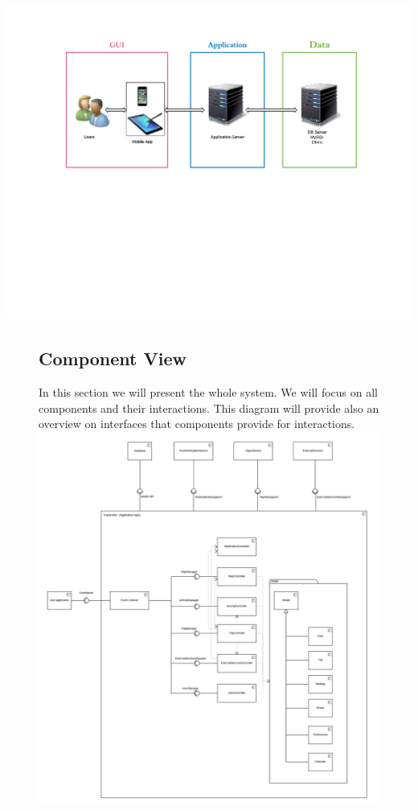 \documentclass[12pt,titlepage]{article}
\begin{document}
\includegraphics[scale=0.5]{"General Architecture - Page 1"}
\pagebreak


\begin{figure}
\subsection{Component View}
In this section we will present the whole system. We will focus on all components and their interactions. This diagram will provide also an overview on interfaces that components provide for interactions.
\includegraphics[scale=0.24]{"Component Diagram - Page 1"}
\end{figure}
\end{document}
